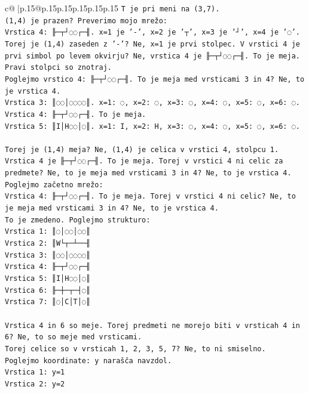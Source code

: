 \documentclass{article}
\begin{document}
{\begin{supertabular}{c@{$\;$}|p{.15\linewidth}@{}p{.15\linewidth}p{.15\linewidth}p{.15\linewidth}p{.15\linewidth}p{.15\linewidth}}
{{{\texttt{T je pri meni na (3,7).} \\
\texttt{(1,4) je prazen? Preverimo mojo mrežo:} \\
\texttt{Vrstica 4: ╟─┬┘◌◌┌─╢. x=1 je '{-}', x=2 je '┬', x=3 je '┘', x=4 je '◌'. Torej je (1,4) zaseden z '{-}'? Ne, x=1 je prvi stolpec. V vrstici 4 je prvi simbol po levem okvirju? Ne, vrstica 4 je ╟─┬┘◌◌┌─╢. To je meja. Pravi stolpci so znotraj.} \\
\texttt{Poglejmo vrstico 4: ╟─┬┘◌◌┌─╢. To je meja med vrsticami 3 in 4? Ne, to je vrstica 4.} \\
\texttt{Vrstica 3: ║◌◌│◌◌◌◌║. x=1: ◌, x=2: ◌, x=3: ◌, x=4: ◌, x=5: ◌, x=6: ◌.} \\
\texttt{Vrstica 4: ╟─┬┘◌◌┌─╢. To je meja.} \\
\texttt{Vrstica 5: ║I│H◌◌│◌║. x=1: I, x=2: H, x=3: ◌, x=4: ◌, x=5: ◌, x=6: ◌.} \\
\\ 
\texttt{Torej je (1,4) meja? Ne, (1,4) je celica v vrstici 4, stolpcu 1.} \\
\texttt{Vrstica 4 je ╟─┬┘◌◌┌─╢. To je meja. Torej v vrstici 4 ni celic za predmete? Ne, to je meja med vrsticami 3 in 4? Ne, to je vrstica 4.} \\
\texttt{Poglejmo začetno mrežo:} \\
\texttt{Vrstica 4: ╟─┬┘◌◌┌─╢. To je meja. Torej v vrstici 4 ni celic? Ne, to je meja med vrsticami 3 in 4? Ne, to je vrstica 4.} \\
\texttt{To je zmedeno. Poglejmo strukturo:} \\
\texttt{Vrstica 1: ║◌│◌◌│◌◌║} \\
\texttt{Vrstica 2: ║W└┬─┴──╢} \\
\texttt{Vrstica 3: ║◌◌│◌◌◌◌║} \\
\texttt{Vrstica 4: ╟─┬┘◌◌┌─╢} \\
\texttt{Vrstica 5: ║I│H◌◌│◌║} \\
\texttt{Vrstica 6: ╟─┼─┬─┤◌║} \\
\texttt{Vrstica 7: ║◌│C│T│◌║} \\
\\ 
\texttt{Vrstica 4 in 6 so meje. Torej predmeti ne morejo biti v vrsticah 4 in 6? Ne, to so meje med vrsticami.} \\
\texttt{Torej celice so v vrsticah 1, 2, 3, 5, 7? Ne, to ni smiselno.} \\
\texttt{Poglejmo koordinate: y narašča navzdol.} \\
\texttt{Vrstica 1: y=1} \\
\texttt{Vrstica 2: y=2} \\
}}}
\end{supertabular}}
\end{document}

